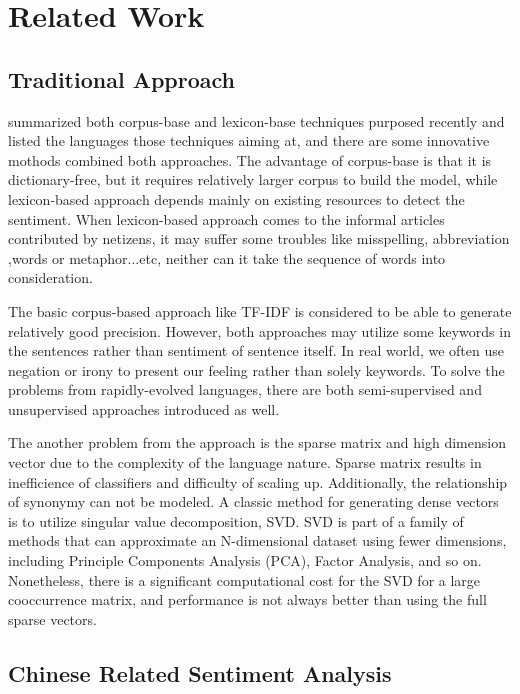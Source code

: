 \chapter{Related Work}


\section{Traditional Approach}

\cite{Dashtipour2016} summarized both corpus-base and lexicon-base techniques purposed recently and listed the languages those techniques aiming at, and there are some innovative mothods combined both approaches. 
The advantage of corpus-base is that it is dictionary-free, but it requires relatively larger corpus to build the model, while lexicon-based approach depends mainly on existing resources to detect the sentiment.
When lexicon-based approach comes to the informal articles contributed by netizens, it may suffer some troubles like misspelling, abbreviation ,words or metaphor...etc, neither can it take the sequence of words into consideration.   

The basic corpus-based approach like TF-IDF is considered to be able to generate relatively good precision.
However, both approaches may utilize some keywords in the sentences rather than sentiment of sentence itself. In real world, we often use negation or irony to present our feeling rather than solely keywords.
To solve the problems from rapidly-evolved languages, there are both semi-supervised and unsupervised approaches introduced as well. 

The another problem from the approach is the sparse matrix and high dimension vector due to the complexity of the language nature. 
Sparse matrix results in inefficience of classifiers and difficulty of scaling up. Additionally, the relationship of synonymy can not be modeled.
A classic method for generating dense vectors is to utilize singular value decomposition, SVD.
SVD is part of a family of methods that can approximate an N-dimensional dataset using fewer dimensions, including Principle Components Analysis (PCA), Factor Analysis, and so on.
Nonetheless, there is a significant computational cost for the SVD for a large cooccurrence matrix, and performance is not always better than using the full sparse vectors.

\section{Chinese Related Sentiment Analysis}

